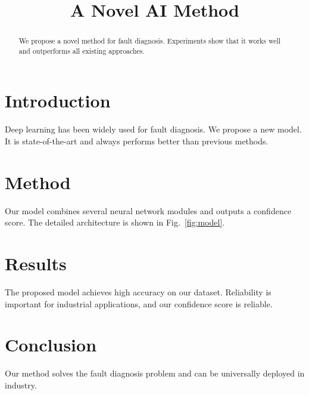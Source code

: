 \documentclass{article}
\title{A Novel AI Method}
\begin{document}
\maketitle
\begin{abstract}
We propose a novel method for fault diagnosis. Experiments show that it works well and outperforms all existing approaches.
\end{abstract}

\section{Introduction}
Deep learning has been widely used for fault diagnosis. We propose a new model. It is state-of-the-art and always performs better than previous methods.

\section{Method}
Our model combines several neural network modules and outputs a confidence score. The detailed architecture is shown in Fig.~\ref{fig:model}.

\section{Results}
The proposed model achieves high accuracy on our dataset. Reliability is important for industrial applications, and our confidence score is reliable.

\section{Conclusion}
Our method solves the fault diagnosis problem and can be universally deployed in industry.
\end{document}
